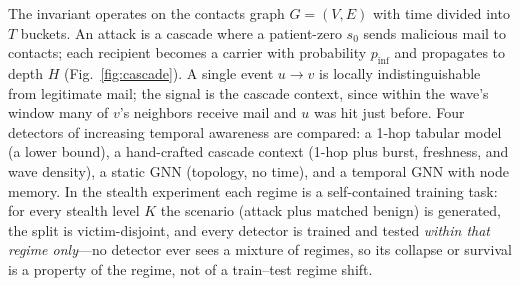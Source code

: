 \smallskip The invariant operates on the contacts graph
$G=(V,E)$ with time divided into $T$ buckets. An attack is a cascade where a patient-zero $s_0$ sends malicious mail
to contacts; each recipient becomes a carrier with probability $p_\mathrm{inf}$ and propagates to depth $H$
(Fig.~\ref{fig:cascade}). A single event $u\!\to\!v$ is locally indistinguishable from legitimate mail; the
signal is the cascade context, since within the wave's window many of $v$'s neighbors receive mail and $u$ was
hit just before. Four detectors of increasing temporal awareness are compared: a 1-hop tabular model (a lower
bound), a hand-crafted cascade context (1-hop plus burst, freshness, and wave density), a static GNN (topology,
no time), and a temporal GNN with node memory.
In the stealth experiment each regime is a self-contained
training task: for every stealth level $K$ the scenario (attack plus matched benign) is generated, the split is
victim-disjoint, and every detector is trained and tested \emph{within that regime only}---no detector ever
sees a mixture of regimes, so its collapse or survival is a property of the regime, not of a train--test
regime shift.

